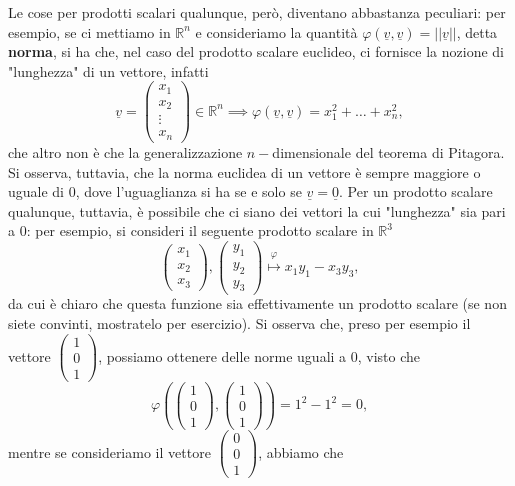 Le cose per prodotti scalari qualunque, però, diventano abbastanza peculiari: per esempio, se ci mettiamo in $\mathbb{R}^n$ e consideriamo la quantità $\varphi(\underline{v}, \underline{v}) = ||\underline{v}||$, detta \textbf{norma}, si ha che, nel caso del prodotto scalare euclideo, ci fornisce la nozione di "lunghezza" di un vettore, infatti
$$
	\underline{v} = \begin{pmatrix}
		x_1 \\
		x_2 \\
		\vdots \\
		x_n
	\end{pmatrix} \in \mathbb{R}^n \implies \varphi(\underline{v}, \underline{v}) = x_1^2 + \ldots + x^2_n,
$$
che altro non è che la generalizzazione $n-$dimensionale del teorema di Pitagora. Si osserva, tuttavia, che la norma euclidea di un vettore è sempre maggiore o uguale di 0, dove l'uguaglianza si ha se e solo se $\underline{v} = \underline{0}$. Per un prodotto scalare qualunque, tuttavia, è possibile che ci siano dei vettori la cui "lunghezza" sia pari a 0: per esempio, si consideri il seguente prodotto scalare in $\mathbb{R}^3$
$$
	\begin{pmatrix}
		x_1 \\
		x_2 \\
		x_3
	\end{pmatrix}, \begin{pmatrix}
		y_1 \\
		y_2 \\
		y_3
	\end{pmatrix} \stackrel{\varphi}{\mapsto} x_1 y_1 - x_3 y_3,
$$
da cui è chiaro che questa funzione sia effettivamente un prodotto scalare (se non siete convinti, mostratelo per esercizio). Si osserva che, preso per esempio il vettore $\begin{pmatrix}
1 \\
0 \\
1
\end{pmatrix}$, possiamo ottenere delle norme uguali a 0, visto che
$$
	\varphi(\begin{pmatrix} 1 \\ 0 \\ 1 \end{pmatrix}, \begin{pmatrix} 1 \\ 0 \\ 1 \end{pmatrix}) = 1^2 - 1^2 = 0,
$$
mentre se consideriamo il vettore $\begin{pmatrix} 0 \\ 0 \\ 1 \end{pmatrix}$, abbiamo che

